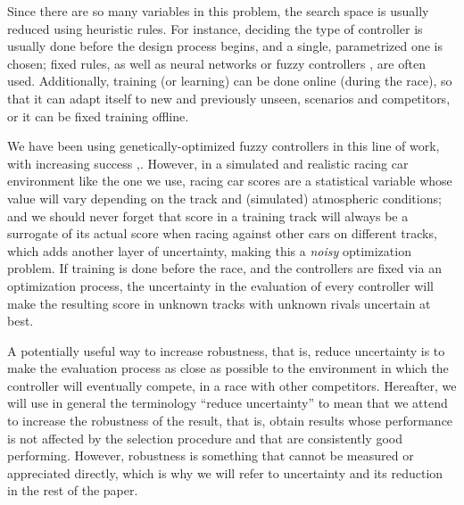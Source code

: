 \documentclass[10pt,journal,compsoc]{IEEEtran}
\begin{document}
Since there are so many variables in this problem, the search space is usually reduced using heuristic rules. For instance, deciding the type of controller is usually done before the design process begins, and a single, parametrized one
is chosen; fixed rules, as well as neural networks \cite{KIM201287} or fuzzy controllers \cite{PerezEvolvingFuzzy09}, are often used. 
Additionally, training (or learning) \cite{Loiacono:2012:LEA:2212908.2212953} can be done online (during the
race), so that it can adapt itself to new and previously unseen,
scenarios and competitors, or it can be fixed training offline. 

We have been using genetically-optimized fuzzy controllers in this line of work, with increasing success \cite{salem_evo17},\cite{salem_evo18}.
However, in a simulated and realistic racing car environment like the one we use, racing car scores are a
    statistical variable whose value will vary depending on the track and
    (simulated) atmospheric conditions; and we should never forget
    that score in a training track will always be a surrogate of its
    actual score when racing against other cars on different tracks,
    which adds another layer of uncertainty, making this a {\em noisy} optimization problem.
If training is done before the
    race, and the controllers are fixed via an optimization process,
    the uncertainty in the evaluation of every controller will make
    the resulting score in unknown tracks with unknown rivals
    uncertain at best.

A potentially useful way to increase robustness, that
is, reduce uncertainty is to make the evaluation process
as close as possible to the environment in which the controller will
eventually compete, in a race with other competitors. Hereafter, we will use in general the
  terminology ``reduce uncertainty'' to mean that we attend to increase the robustness of the result, that is, obtain results whose
  performance is not affected by the selection procedure and that are
  consistently good performing. However, robustness is something that
  cannot be measured or appreciated directly, which is why we will
  refer to uncertainty and its reduction in the rest of the paper.
\end{document}
